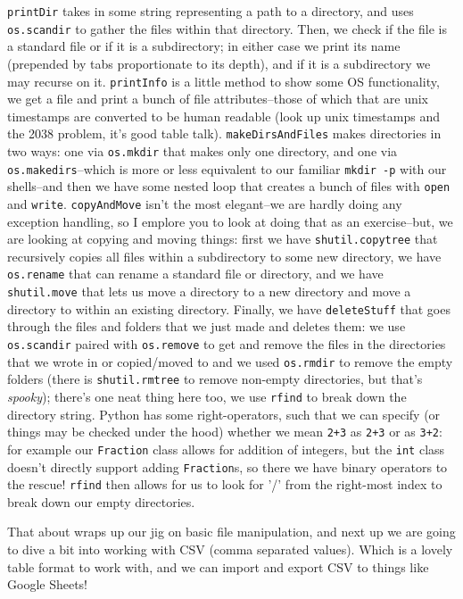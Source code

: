 \documentclass[12pt, twoside, reqno]{book}
\begin{document}
\texttt{printDir} takes in some string representing a path to a directory, and uses \texttt{os.scandir} to gather the files within that directory. Then, we check if the file is a standard file or if it is a subdirectory; in either case we print its name (prepended by tabs proportionate to its depth), and if it is a subdirectory we may recurse on it. \texttt{printInfo} is a little method to show some OS functionality, we get a file and print a bunch of file attributes--those of which that are unix timestamps are converted to be human readable (look up unix timestamps and the 2038 problem, it's good table talk). \texttt{makeDirsAndFiles} makes directories in two ways: one via \texttt{os.mkdir} that makes only one directory, and one via \texttt{os.makedirs}--which is more or less equivalent to our familiar \texttt{mkdir -p} with our shells--and then we have some nested loop that creates a bunch of files with \texttt{open} and \texttt{write}. \texttt{copyAndMove} isn't the most elegant--we are hardly doing any exception handling, so I emplore you to look at doing that as an exercise--but, we are looking at copying and moving things: first we have \texttt{shutil.copytree} that recursively copies all files within a subdirectory to some new directory, we have \texttt{os.rename} that can rename a standard file or directory, and we have \texttt{shutil.move} that lets us move a directory to a new directory and move a directory to within an existing directory. Finally, we have \texttt{deleteStuff} that goes through the files and folders that we just made and deletes them: we use \texttt{os.scandir} paired with \texttt{os.remove} to get and remove the files in the directories that we wrote in or copied/moved to and we used \texttt{os.rmdir} to remove the empty folders (there is \texttt{shutil.rmtree} to remove non-empty directories, but that's \textit{spooky}); there's one neat thing here too, we use \texttt{rfind} to break down the directory string. Python has some right-operators, such that we can specify (or things may be checked under the hood) whether we mean \texttt{2+3} as \texttt{2+3} or as \texttt{3+2}: for example our \texttt{Fraction} class allows for addition of integers, but the \texttt{int} class doesn't directly support adding \texttt{Fraction}s, so there we have binary operators to the rescue! \texttt{rfind} then allows for us to look for '/' from the right-most index to break down our empty directories.

That about wraps up our jig on basic file manipulation, and next up we are going to dive a bit into working with CSV (comma separated values). Which is a lovely table format to work with, and we can import and export CSV to things like Google Sheets!
\end{document}
